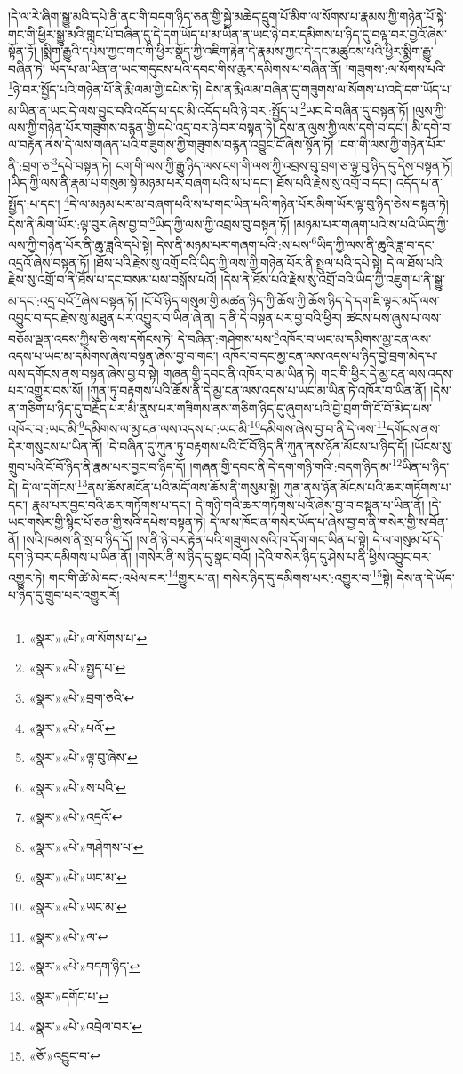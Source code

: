 །དེ་ལ་རེ་ཞིག་སྒྱུ་མའི་དཔེ་ནི་ནང་གི་བདག་ཉིད་ཅན་གྱི་སྐྱེ་མཆེད་དྲུག་པོ་མིག་ལ་སོགས་པ་རྣམས་ཀྱི་གཉེན་པོ་སྟེ་གང་གི་ཕྱིར་སྒྱུ་མའི་གླང་པོ་བཞིན་དུ་དེ་དག་ཡོད་པ་མ་ཡིན་ན་ཡང་ཉེ་བར་དམིགས་པ་ཉིད་དུ་བལྟ་བར་བྱའོ་ཞེས་སྟོན་ཏོ། །སྨིག་རྒྱུའི་དཔེས་ཀྱང་གང་གི་ཕྱིར་སྣོད་ཀྱི་འཇིག་རྟེན་དེ་རྣམས་ཀྱང་དེ་དང་མཚུངས་པའི་ཕྱིར་སྨིག་རྒྱུ་བཞིན་ཏེ། ཡོད་པ་མ་ཡིན་ན་ཡང་གདུངས་པའི་དབང་གིས་ཆུར་དམིགས་པ་བཞིན་ནོ། །གཟུགས་:ལ་སོགས་པའི་\footnote{«སྣར་»«པེ་»ལ་སོགས་པ་}ཉེ་བར་སྤྱོད་པའི་གཉེན་པོ་ནི་རྨི་ལམ་གྱི་དཔེས་ཏེ། དེས་ན་རྨི་ལམ་བཞིན་དུ་གཟུགས་ལ་སོགས་པ་འདི་དག་ཡོད་པ་མ་ཡིན་ན་ཡང་དེ་ལས་བྱུང་བའི་འདོད་པ་དང་མི་འདོད་པའི་ཉེ་བར་:སྤྱོད་པ་\footnote{«སྣར་»«པེ་»སྤྱད་པ་}ཡང་དེ་བཞིན་དུ་བསྟན་ཏོ། །ལུས་ཀྱི་ལས་ཀྱི་གཉེན་པོར་གཟུགས་བརྙན་གྱི་དཔེ་འདྲ་བར་ཉེ་བར་བསྟན་ཏེ། དེས་ན་ལུས་ཀྱི་ལས་དགེ་བ་དང་། མི་དགེ་བ་ལ་བརྟེན་ནས་དེ་ལས་གཞན་པའི་གཟུགས་ཀྱི་གཟུགས་བརྙན་འབྱུང་ངོ་ཞེས་སྟོན་ཏོ། །ངག་གི་ལས་ཀྱི་གཉེན་པོར་ནི་:བྲག་ཅ་\footnote{«སྣར་»«པེ་»བྲག་ཅའི་}དཔེ་བསྟན་ཏེ། ངག་གི་ལས་ཀྱི་རྒྱུ་ཉིད་ལས་ངག་གི་ལས་ཀྱི་འབྲས་བུ་བྲག་ཅ་ལྟ་བུ་ཉིད་དུ་དེས་བསྟན་ཏོ། །ཡིད་ཀྱི་ལས་ནི་རྣམ་པ་གསུམ་སྟེ་མཉམ་པར་བཞག་པའི་ས་པ་དང་། ཐོས་པའི་རྗེས་སུ་འགྲོ་བ་དང་། འདོད་པ་ན་སྤྱོད་:པ་དང་། \footnote{«སྣར་»«པེ་»པའོ་}དེ་ལ་མཉམ་པར་མ་བཞག་པའི་ས་པ་གང་ཡིན་པའི་གཉེན་པོར་མིག་ཡོར་ལྟ་བུ་ཉིད་ཅེས་བསྟན་ཏེ། དེས་ནི་མིག་ཡོར་:ལྟ་བུར་ཞེས་བྱ་བ་\footnote{«སྣར་»«པེ་»ལྟ་བུ་ཞེས་}ཡིད་ཀྱི་ལས་ཀྱི་འབྲས་བུ་བསྟན་ཏོ། །མཉམ་པར་གཞག་པའི་ས་པའི་ཡིད་ཀྱི་ལས་ཀྱི་གཉེན་པོར་ནི་ཆུ་ཟླའི་དཔེ་སྟེ། དེས་ནི་མཉམ་པར་གཞག་པའི་:ས་པས་\footnote{«སྣར་»«པེ་»ས་པའི་}ཡིད་ཀྱི་ལས་ནི་ཆུའི་ཟླ་བ་དང་འདྲའོ་ཞེས་བསྟན་ཏོ། །ཐོས་པའི་རྗེས་སུ་འགྲོ་བའི་ཡིད་ཀྱི་ལས་ཀྱི་གཉེན་པོར་ནི་སྤྲུལ་པའི་དཔེ་སྟེ། དེ་ལ་ཐོས་པའི་རྗེས་སུ་འགྲོ་བ་ནི་ཐོས་པ་དང་བསམ་པས་བསྒོས་པའོ། །དེས་ནི་ཐོས་པའི་རྗེས་སུ་འགྲོ་བའི་ཡིད་ཀྱི་འཇུག་པ་ནི་སྒྱུ་མ་དང་:འདྲ་བའོ་\footnote{«སྣར་»«པེ་»འདྲའོ་}ཞེས་བསྟན་ཏོ། །ངོ་བོ་ཉིད་གསུམ་གྱི་མཚན་ཉིད་ཀྱི་ཆོས་ཀྱི་ཆོས་ཉིད་དེ་དག་ཇི་ལྟར་མདོ་ལས་འབྱུང་བ་དང་རྗེས་སུ་མཐུན་པར་འགྱུར་བ་ཡིན་ཞེ་ན། ད་ནི་དེ་བསྟན་པར་བྱ་བའི་ཕྱིར། ཚངས་པས་ཞུས་པ་ལས་བཅོམ་ལྡན་འདས་ཀྱིས་ཅི་ལས་དགོངས་ཏེ། དེ་བཞིན་:གཤེགས་པས་\footnote{«སྣར་»«པེ་»གཤེགས་པ་}འཁོར་བ་ཡང་མ་དམིགས་མྱ་ངན་ལས་འདས་པ་ཡང་མ་དམིགས་ཞེས་བསྟན་ཞེས་བྱ་བ་གང་། འཁོར་བ་དང་མྱ་ངན་ལས་འདས་པ་ཉིད་བྱེ་བྲག་མེད་པ་ལས་དགོངས་ནས་བསྟན་ཞེས་བྱ་བ་སྟེ། གཞན་གྱི་དབང་ནི་འཁོར་བ་མ་ཡིན་ཏེ། གང་གི་ཕྱིར་དེ་མྱ་ངན་ལས་འདས་པར་འགྱུར་བས་སོ། །ཀུན་ཏུ་བརྟགས་པའི་ཆོས་ནི་དེ་མྱ་ངན་ལས་འདས་པ་ཡང་མ་ཡིན་ཏེ་འཁོར་བ་ཡིན་ནོ། །དེས་ན་གཅིག་པ་ཉིད་དུ་བརྗོད་པར་མི་ནུས་པར་གཟིགས་ནས་གཅིག་ཉིད་དུ་ཞུགས་པའི་བྱེ་བྲག་གི་ངོ་བོ་མེད་པས་འཁོར་བ་:ཡང་མི་\footnote{«སྣར་»«པེ་»ཡང་མ་}དམིགས་ལ་མྱ་ངན་ལས་འདས་པ་:ཡང་མི་\footnote{«སྣར་»«པེ་»ཡང་མ་}དམིགས་ཞེས་བྱ་བ་ནི་དེ་ལས་\footnote{«སྣར་»«པེ་»ལ་}དགོངས་ནས་དེར་གསུངས་པ་ཡིན་ནོ། །དེ་བཞིན་དུ་ཀུན་ཏུ་བརྟགས་པའི་ངོ་བོ་ཉིད་ནི་ཀུན་ནས་ཉོན་མོངས་པ་ཉིད་དོ། །ཡོངས་སུ་གྲུབ་པའི་ངོ་བོ་ཉིད་ནི་རྣམ་པར་བྱང་བ་ཉིད་དོ། །གཞན་གྱི་དབང་ནི་དེ་དག་གཉི་གའི་:བདག་ཉིད་མ་\footnote{«སྣར་»«པེ་»བདག་ཉིད་}ཡིན་པ་ཉིད་དེ། དེ་ལ་དགོངས་\footnote{«སྣར་»དགོང་པ་}ནས་ཆོས་མངོན་པའི་མདོ་ལས་ཆོས་ནི་གསུམ་སྟེ། ཀུན་ནས་ཉོན་མོངས་པའི་ཆར་གཏོགས་པ་དང་། རྣམ་པར་བྱང་བའི་ཆར་གཏོགས་པ་དང་། དེ་གཉི་གའི་ཆར་གཏོགས་པའོ་ཞེས་བྱ་བ་བསྟན་པ་ཡིན་ནོ། །དེ་ཡང་གསེར་གྱི་སྙིང་པོ་ཅན་གྱི་སའི་དཔེས་བསྟན་ཏེ། དེ་ལ་ས་ཁོང་ན་གསེར་ཡོད་པ་ཞེས་བྱ་བ་ནི་གསེར་གྱི་ས་བོན་ནོ། །སའི་ཁམས་ནི་སྲ་བ་ཉིད་དོ། །ས་ནི་ཉེ་བར་རྟེན་པའི་གཟུགས་སའི་ཁ་དོག་གང་ཡིན་པ་སྟེ། དེ་ལ་གསུམ་པོ་དེ་དག་ཉེ་བར་དམིགས་པ་ཡིན་ནོ། །གསེར་ནི་ས་ཉིད་དུ་སྣང་བའོ། །དེའི་གསེར་ཉིད་དུ་ཤེས་པ་ནི་ཕྱིས་འབྱུང་བར་འགྱུར་ཏེ། གང་གི་ཚེ་མེ་དང་:འཕེལ་བར་\footnote{«སྣར་»«པེ་»འབྲེལ་བར་}གྱུར་པ་ན། གསེར་ཉིད་དུ་དམིགས་པར་:འགྱུར་བ་\footnote{«ཅོ་»འབྱུང་བ་}སྟེ། དེས་ན་དེ་ཡོད་པ་ཉིད་དུ་གྲུབ་པར་འགྱུར་རོ། 